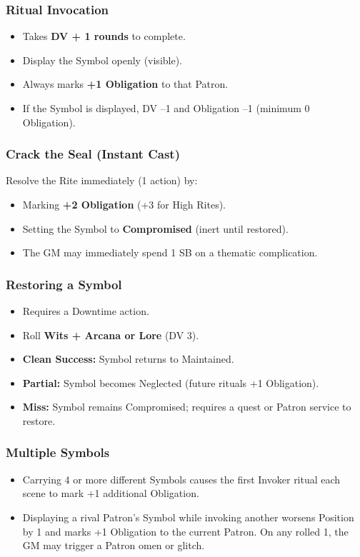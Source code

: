 \subsubsection{Ritual Invocation}
\begin{itemize}
  \item Takes \textbf{DV + 1 rounds} to complete.
  \item Display the Symbol openly (visible).
  \item Always marks \textbf{+1 Obligation} to that Patron.
  \item If the Symbol is displayed, DV –1 and Obligation –1 (minimum 0 Obligation).
\end{itemize}

\subsubsection{Crack the Seal (Instant Cast)}
Resolve the Rite immediately (1 action) by:
\begin{itemize}
  \item Marking \textbf{+2 Obligation} (+3 for High Rites).
  \item Setting the Symbol to \textbf{Compromised} (inert until restored).
  \item The GM may immediately spend 1 SB on a thematic complication.
\end{itemize}

\subsubsection{Restoring a Symbol}
\begin{itemize}
  \item Requires a Downtime action.
  \item Roll \textbf{Wits + Arcana or Lore} (DV 3).
  \item \textbf{Clean Success:} Symbol returns to Maintained.
  \item \textbf{Partial:} Symbol becomes Neglected (future rituals +1 Obligation).
  \item \textbf{Miss:} Symbol remains Compromised; requires a quest or Patron service to restore.
\end{itemize}

\subsubsection{Multiple Symbols}
\begin{itemize}
  \item Carrying 4 or more different Symbols causes the first Invoker ritual each scene to mark +1 additional Obligation.
  \item Displaying a rival Patron's Symbol while invoking another worsens Position by 1 and marks +1 Obligation to the current Patron. On any rolled 1, the GM may trigger a Patron omen or glitch.
\end{itemize}

